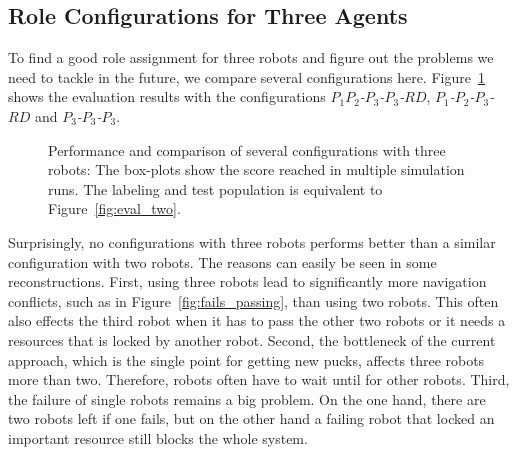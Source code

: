 \subsection{Role Configurations for Three Agents}
To find a good role assignment for three robots and figure out the problems we need to tackle in the future, we compare several configurations here. Figure~\ref{fig:eval_three} shows the evaluation results with the configurations \textit{$P_1P_2$-$P_3$-$P_3$-$RD$}, \textit{$P_1$-$P_2$-$P_3$-$RD$} and \textit{$P_3$-$P_3$-$P_3$}.
\begin{figure}
  \centering
  \caption[Performance and comparison of several configurations with three robots]{Performance and comparison of several configurations with three robots: The box-plots show the score reached in multiple simulation runs. The labeling and test population is equivalent to Figure~\ref{fig:eval_two}.}
  \label{fig:eval_three}
\end{figure}
Surprisingly, no configurations with three robots performs better than a similar configuration with two robots. The reasons can easily be seen in some reconstructions. First, using three robots lead to significantly more navigation conflicts, such as in Figure~\ref{fig:fails_passing}, than using two robots. This often also effects the third robot when it has to pass the other two robots or it needs a resources that is locked by another robot. Second, the bottleneck of the current approach, which is the single point for getting new pucks, affects three robots more than two. Therefore, robots often have to wait until for other robots. Third, the failure of single robots remains a big problem. On the one hand, there are two robots left if one fails, but on the other hand a failing robot that locked an important resource still blocks the whole system.



